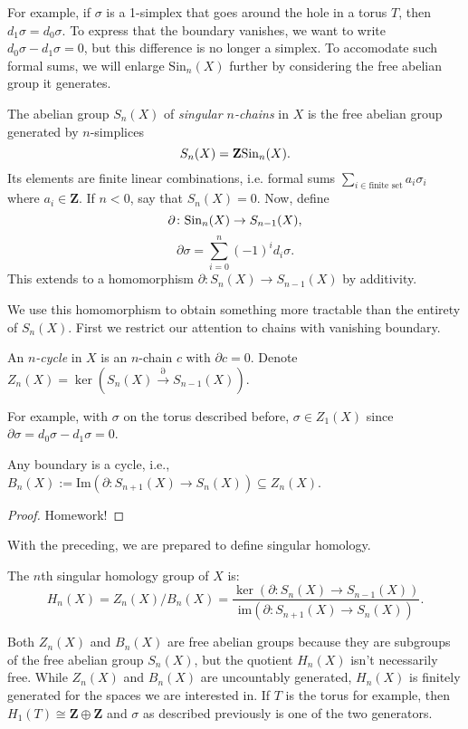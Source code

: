 For example, if $\sigma$ is a 1-simplex that goes around the hole in a torus $T$, then $d_1\sigma = d_0\sigma$. To express that the boundary vanishes, we want to write $d_0\sigma - d_1\sigma=0$, but this difference is no longer a simplex. To accomodate such formal sums, we will enlarge $\mathrm{Sin}_n(X)$ further by considering the free abelian group it generates.
\begin{definition}
The abelian group $S_n(X)$ of \emph{singular $n$-chains} in $X$ is the free abelian group generated by $n$-simplices
$$S_n(X) = \mathbf{Z}\mathrm{Sin}_n(X).$$
    Its elements are finite linear combinations, i.e. formal sums $\sum_{i\in\text{finite set}}a_i\sigma_i$ where $a_i\in\mathbf{Z}$. If $n<0$, say that $S_n(X)=0$. Now, define
$$\partial\colon \mathrm{Sin}_n(X)\to S_{n-1}(X),$$
$$\partial\sigma = \sum_{i=0}^n(-1)^i d_i\sigma.$$
This extends to a homomorphism $\partial \colon S_n(X) \to S_{n-1}(X)$ by additivity.
\end{definition}
We use this homomorphism to obtain something more tractable than the entirety of $S_n(X)$. First we restrict our attention to chains with vanishing boundary.
\begin{definition}
An \emph{$n$-cycle} in $X$ is an $n$-chain $c$ with $\partial c = 0$. Denote $Z_n(X) = \ker(S_n(X)\xrightarrow{\partial}S_{n-1}(X))$.
\end{definition}
For example, with $\sigma$ on the torus described before, $\sigma\in Z_1(X)$ since $\partial \sigma = d_0\sigma - d_1\sigma = 0$.
\begin{theorem}
Any boundary is a cycle, i.e., $B_n(X) := \mathrm{Im}(\partial:S_{n+1}(X)\to S_n(X))\subseteq Z_n(X)$.
\end{theorem}
\begin{proof}
    Homework!
\end{proof}
With the preceding, we are prepared to define singular homology.
\begin{definition}
The $n$th singular homology group of $X$ is:
    $$ H_n(X) = Z_n(X)/B_n(X) = \frac{\ker(\partial:S_n(X)\to S_{n-1}(X))}{\mathrm{im}(\partial:S_{n+1}(X)\to S_n(X))}.$$
\end{definition}
Both $Z_n(X)$ and $B_n(X)$ are free abelian groups because they are subgroups of the free abelian group $S_n(X)$, but the quotient $H_n(X)$ isn't necessarily free. While $Z_n(X)$ and $B_n(X)$ are uncountably generated, $H_n(X)$ is finitely generated for the spaces we are interested in. If $T$ is the torus for example, then $H_1(T) \cong \mathbf{Z} \oplus \mathbf{Z}$ and $\sigma$ as described previously is one of the two generators.